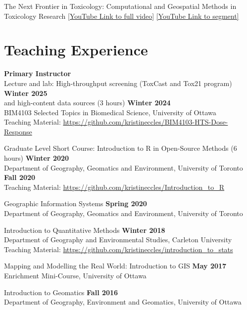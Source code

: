 \documentclass[margin,line]{res}
\begin{document}
\begin{resume}
The Next Frontier in Toxicology: Computational and Geospatial Methods in Toxicology Research \href{https://www.youtube.com/watch?v=-vlSMeWfeKs\&t=939s}{[YouTube Link to full video]}
\href{https://www.youtube.com/watch?v=vgu6d1uT8K4}{[YouTube Link to segment]}


\vspace*{.1in}
\section{\sc Teaching Experience}
\textbf{Primary Instructor}\\
Lecture and lab: High-throughput screening (ToxCast and Tox21 program) \hfill {\textbf{Winter 2025}}\\
and high-content data sources (3 hours) \hfill {\textbf{Winter 2024}}\\
BIM4103 Selected Topics in Biomedical Science, University of Ottawa\\
Teaching Material: \url{https://github.com/kristineccles/BIM4103-HTS-Dose-Response}

Graduate Level Short Course: Introduction to R in Open-Source Methods (6 hours) \hfill {\textbf{Winter 2020}}\\
Department of Geography, Geomatics and Environment, University of Toronto \hfill {\textbf{Fall 2020}}
\\Teaching Material: \url{https://github.com/kristineccles/Introduction_to_R}

Geographic Information Systems \hfill {\textbf{Spring 2020}}\\
Department of Geography, Geomatics and Environment, University of Toronto

Introduction to Quantitative Methods
 \hfill {\textbf{Winter 2018}}\\
Department of Geography and Environmental Studies, Carleton University\\
Teaching Material: \url{https://github.com/kristineccles/introduction_to_stats}

Mapping and Modelling the Real World: Introduction to GIS \hfill {\textbf{May 2017}}\\
Enrichment Mini-Course, University of Ottawa

Introduction to Geomatics
\hfill {\textbf{Fall 2016}}\\
Department of Geography, Environment and Geomatics, University of Ottawa

\vspace*{.1in}


\end{resume}
\end{document}
